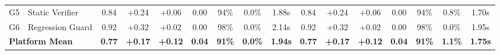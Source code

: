 \begin{table}[t]
\begin{tabular}{llccccccc|ccccccc}
G5 & Static Verifier & 0.84 & +0.24 & +0.06 & 0.00 & 94\% & 0.0\% & 1.88s & 0.84 & +0.24 & +0.06 & 0.00 & 94\% & 0.8\% & 1.70s \\
G6 & Regression Guard & 0.92 & +0.32 & +0.02 & 0.00 & 98\% & 0.0\% & 2.14s & 0.92 & +0.32 & +0.02 & 0.00 & 98\% & 0.0\% & 1.95s \\
\midrule
\multicolumn{2}{l}{\textbf{Platform Mean}} & \textbf{0.77} & \textbf{+0.17} & \textbf{+0.12} & \textbf{0.04} & \textbf{91\%} & \textbf{0.0\%} & \textbf{1.94s} & \textbf{0.77} & \textbf{+0.17} & \textbf{+0.12} & \textbf{0.04} & \textbf{91\%} & \textbf{1.1\%} & \textbf{1.75s} \\
\bottomrule
\end{tabular}
\end{table}
